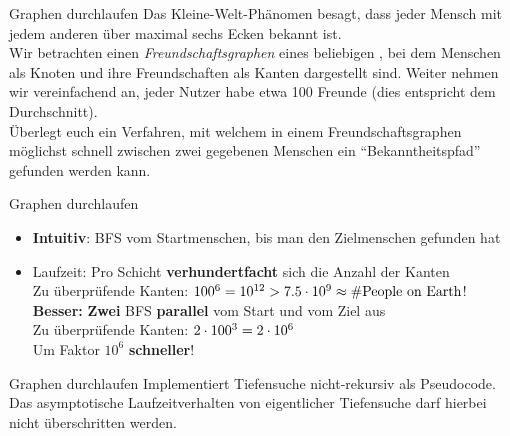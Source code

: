 \begin{frame}{Graphen durchlaufen}
	Das Kleine-Welt-Phänomen besagt, dass jeder Mensch mit jedem anderen über maximal sechs Ecken bekannt ist.\\
	\medskip
	Wir betrachten einen \emph{Freundschaftsgraphen} eines beliebigen , bei dem Menschen als Knoten und ihre Freundschaften als Kanten dargestellt sind.
	Weiter nehmen wir vereinfachend an, jeder Nutzer habe etwa 100 Freunde (dies entspricht dem Durchschnitt).\\
	\medskip
	Überlegt euch ein Verfahren, mit welchem in einem Freundschaftsgraphen möglichst schnell zwischen zwei gegebenen Menschen ein \enquote{Bekanntheitspfad} gefunden werden kann.
\end{frame}

\begin{frame}{Graphen durchlaufen}
	\solutionheading
	\begin{itemize}
		\item<+-> \textbf{Intuitiv}: BFS vom Startmenschen, bis man den Zielmenschen gefunden hat
		\item<+->[\Cons\symbitemnegoffset] Laufzeit: Pro Schicht \textbf{verhundertfacht} sich die Anzahl der Kanten \\
			\impl Zu überprüfende Kanten: \quad $100^6 = 10^{12} > 7.5 \cdot 10^9 \approx \text{\#People on Earth}$!
		\implitem<+-> \textbf{Besser: } \textbf{Zwei} BFS \textbf{parallel} vom Start und vom Ziel aus \\
			\impl Zu überprüfende Kanten: \quad $2 \cdot 100^3 = 2 \cdot 10^6$ \\
			\impl Um Faktor $10^6$ \textbf{schneller}!
	\end{itemize}
\end{frame}


\begin{frame}{Graphen durchlaufen}
	Implementiert Tiefensuche nicht-rekursiv als Pseudocode. Das asymptotische Laufzeitverhalten von eigentlicher Tiefensuche darf hierbei nicht überschritten werden.
\end{frame}

